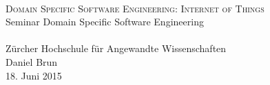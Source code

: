 




\begin{titlepage}
   \mbox{}\vspace{5\baselineskip}\\
   \rmfamily\huge
   \centering
   \textsc{Domain Specific Software Engineering: Internet of Things} \\[2ex]
   Seminar Domain Specific Software Engineering
   \rmfamily\Large
   \vspace{1\baselineskip}\\
   \mbox{}
   \vspace{3\baselineskip}\\
   Zürcher Hochschule für Angewandte Wissenschaften
   \vspace{5\baselineskip}\\
   \rmfamily\Large
   Daniel Brun
   \vspace{1\baselineskip}\\
   18. Juni 2015
\end{titlepage}
 



% 
